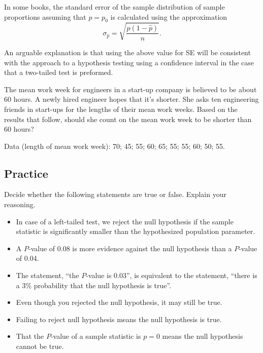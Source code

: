 \begin{remark}

In some books, the standard error of the sample distribution of sample
proportions assuming that \(p=p_0\) is calculated using the
approximation \[
\sigma_{\hat{p}}=\sqrt{\frac{\hat{p}(1-\hat{p})}{n}}.
\]

An arguable explanation is that using the above value for SE will be
consistent with the approach to a hypothesis testing using a confidence
interval in the case that a two-tailed test is preformed.

\end{remark}

\begin{example}

  The mean work week for engineers in a start-up company is believed to be
  about 60 hours. A newly hired engineer hopes that it's shorter. She asks
  ten engineering friends in start-ups for the lengths of their mean work
  weeks. Based on the results that follow, should she count on the mean
  work week to be shorter than 60 hours?
  
  Data (length of mean work week): 70; 45; 55; 60; 65; 55; 55; 60; 50; 55.
  
\end{example}
\vspace*{8\baselineskip}


\hypertarget{practice}{%
\subsection{Practice}\label{practice}}

\begin{exercise}

Decide whether the following statements are true or false. Explain your reasoning.

\begin{itemize}
\item
  In case of a left-tailed test, we reject the null hypothesis if the
  sample statistic is significantly smaller than the hypothesized
  population parameter.
\item
  A \(P\)-value of 0.08 is more evidence against the null hypothesis
  than a \(P\)-value of 0.04.
\item
  The statement, ``the \(P\)-value is 0.03'', is equivalent to the
  statement, ``there is a 3\% probability that the null hypothesis is
  true''.
\item
  Even though you rejected the null hypothesis, it may still be true.
\item
  Failing to reject null hypothesis means the null hypothesis is true.
\item
  That the \(P\)-value of a sample statistic is \(p=0\) means the null
  hypothesis cannot be true.
\end{itemize}

\end{exercise}
\vspace*{4\baselineskip}

